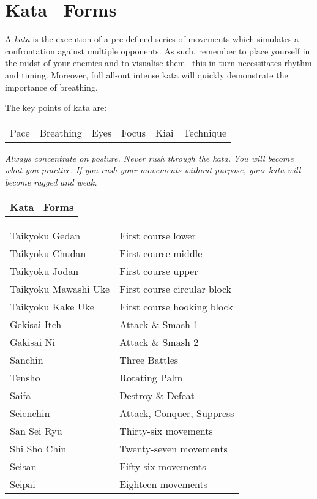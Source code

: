 \documentclass[11pt]{article}
\begin{document}
\section{Kata  --Forms}
\label{sec:org4420240}
A \emph{kata} is the execution of a pre-defined series of movements which simulates
a confrontation against multiple opponents.
As such, remember to place yourself in the midst of your enemies and to visualise them
--this in turn necessitates rhythm and timing.
Moreover, full all-out intense kata will quickly demonstrate the importance of breathing.

\room
The key points of kata are:
\begin{center}
\begin{tabular}{llllll}
Pace & Breathing & Eyes & Focus & Kiai & Technique\\
\end{tabular}
\end{center}

\begin{center}
\emph{Always concentrate on posture. Never rush through the kata.}
\emph{You will become what you practice.} 
\emph{If you rush your movements without purpose, your kata will become ragged and weak.}
\end{center}

\newpage
\begin{center}
\begin{tabular}{l}
\textbf{Kata --Forms}\\
\end{tabular}
\end{center}

\begin{center}
\begin{tabular}{ll}
Taikyoku Gedan & First course lower\\
Taikyoku Chudan & First course middle\\
Taikyoku Jodan & First course upper\\
Taikyoku Mawashi Uke & First course circular block\\
Taikyoku Kake Uke & First course hooking block\\
Gekisai Itch & Attack \& Smash 1\\
Gakisai Ni & Attack \& Smash 2\\
Sanchin & Three Battles\\
Tensho & Rotating Palm\\
Saifa & Destroy \& Defeat\\
Seienchin & Attack, Conquer, Suppress\\
San Sei Ryu & Thirty-six movements\\
Shi Sho Chin & Twenty-seven movements\\
Seisan & Fifty-six movements\\
Seipai & Eighteen movements\\
\end{tabular}
\end{center}
\end{document}

